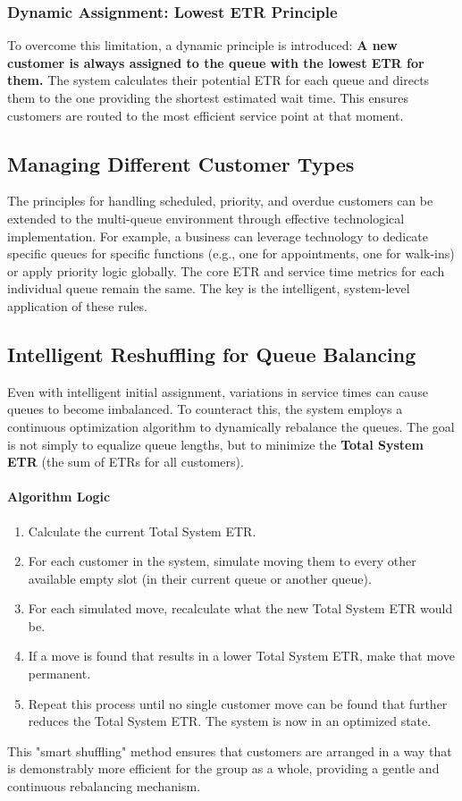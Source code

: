 \documentclass{article}
\begin{document}
\subsubsection{Dynamic Assignment: Lowest ETR Principle}
To overcome this limitation, a dynamic principle is introduced: \textbf{A new customer is always assigned to the queue with the lowest ETR for them.} The system calculates their potential ETR for each queue and directs them to the one providing the shortest estimated wait time. This ensures customers are routed to the most efficient service point at that moment.

\subsection{Managing Different Customer Types}
The principles for handling scheduled, priority, and overdue customers can be extended to the multi-queue environment through effective technological implementation. For example, a business can leverage technology to dedicate specific queues for specific functions (e.g., one for appointments, one for walk-ins) or apply priority logic globally. The core ETR and service time metrics for each individual queue remain the same. The key is the intelligent, system-level application of these rules.

\subsection{Intelligent Reshuffling for Queue Balancing}
Even with intelligent initial assignment, variations in service times can cause queues to become imbalanced. To counteract this, the system employs a continuous optimization algorithm to dynamically rebalance the queues. The goal is not simply to equalize queue lengths, but to minimize the \textbf{Total System ETR} (the sum of ETRs for all customers).

\paragraph{Algorithm Logic}
\begin{enumerate}
    \item Calculate the current Total System ETR.
    \item For each customer in the system, simulate moving them to every other available empty slot (in their current queue or another queue).
    \item For each simulated move, recalculate what the new Total System ETR would be.
    \item If a move is found that results in a lower Total System ETR, make that move permanent.
    \item Repeat this process until no single customer move can be found that further reduces the Total System ETR. The system is now in an optimized state.
\end{enumerate}
This "smart shuffling" method ensures that customers are arranged in a way that is demonstrably more efficient for the group as a whole, providing a gentle and continuous rebalancing mechanism.
\end{document}
